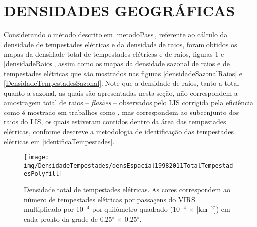 \section{DENSIDADES GEOGRÁFICAS}
\label{secaoDensidades}

Considerando o método descrito em \ref{metodoPass}, referente ao cálculo da densidade de tempestades elétricas e da densidade de raios, foram obtidos os mapas da densidade total de tempestades elétricas e de raios, figuras \ref{densidadeTempestade} e \ref{densidadeRaios}, assim como os mapas da densidade sazonal de raios e de tempestades elétricas que são mostrados nas  figuras \ref{densidadeSazonalRaios} e \ref{DensidadeTempestadesSazonal}. Note que a densidade de raios, tanto a total quanto a sazonal, as quais são apresentadas nesta seção, não correspondem a amostragem total de raios -- \textit{flashes} -- observados pelo LIS corrigida pela eficiência como é mostrado em trabalhos como  , mas correspondem ao subconjunto dos raios do LIS, os quais estiveram contidos dentro da área das tempestades elétricas, conforme descreve a metodologia de identificação das tempestades elétricas em 
\ref{identificaTempestades}.



\begin{figure}[!hb]
 \centering
 {\texttt{[image: img/DensidadeTempestades/densEspacial19982011TotalTempestadesPolyfill]}}
\caption{Densidade total de tempestades elétricas. As cores correspondem ao número de tempestades elétricas por passagens do VIRS multiplicado por 10$^{-4}$ por quilômetro quadrado (10$^{-4}$ $\times$ [km$^{-2}$]) em cada pronto da grade de 0.25$^{\circ}$ $\times$ 0.25$^{\circ}$. }
 \label{densidadeTempestade}
\end{figure}




